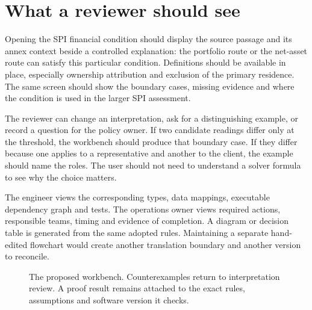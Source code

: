 \documentclass[12pt,a4paper,oneside,openany]{book}
\begin{document}
\section{What a reviewer should see}
\label{merge:P-03-product:01}


Opening the SPI financial condition should display the source passage and its
annex context beside a controlled explanation: the portfolio route or the
net-asset route can satisfy this particular condition. Definitions should be
available in place, especially ownership attribution and exclusion of the primary
residence. The same screen should show the boundary cases, missing evidence and
where the condition is used in the larger SPI assessment.

The reviewer can change an interpretation, ask for a distinguishing example, or
record a question for the policy owner. If two candidate readings differ only at
the threshold, the workbench should produce that boundary case. If they differ
because one applies to a representative and another to the client, the example
should name the roles. The user should not need to understand a solver formula
to see why the choice matters.

The engineer views the corresponding types, data mappings, executable dependency
graph and tests. The operations owner views required actions, responsible teams,
timing and evidence of completion. A diagram or decision table is generated from
the same adopted rules. Maintaining a separate hand-edited flowchart would create
another translation boundary and another version to reconcile.

\begin{figure}[htbp]
\centering
{}
\caption{The proposed workbench. Counterexamples return to interpretation review.
A proof result remains attached to the exact rules, assumptions and software
version it checks.}
\label{fig:architecture}
\end{figure}
\end{document}
